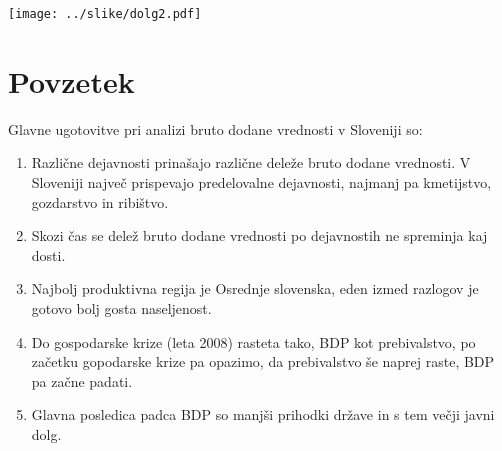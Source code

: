 \documentclass[a4paper, 11pt]{article}
\begin{document}
\begin{center}
\texttt{[image: ../slike/dolg2.pdf]}
\end{center}


\newpage
\section{Povzetek}
Glavne ugotovitve pri analizi bruto dodane vrednosti v Sloveniji so:
\begin{enumerate}
\item Različne dejavnosti prinašajo različne deleže bruto dodane vrednosti. V Sloveniji največ prispevajo predelovalne dejavnosti, najmanj pa kmetijstvo, gozdarstvo in ribištvo.
\item Skozi čas se delež bruto dodane vrednosti po dejavnostih ne spreminja kaj dosti.
\item Najbolj produktivna regija je Osrednje slovenska, eden izmed razlogov je gotovo bolj gosta naseljenost.
\item Do gospodarske krize (leta 2008) rasteta tako, BDP kot prebivalstvo, po začetku gopodarske krize pa opazimo, da prebivalstvo še naprej raste, BDP pa začne padati.
\item Glavna posledica padca BDP so manjši prihodki države in s tem večji javni dolg.
\end{enumerate}
\end{document}
